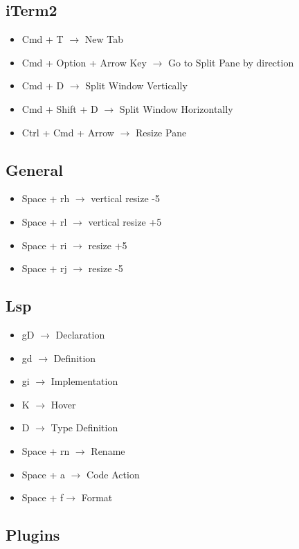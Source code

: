 \documentclass[12pt, a4paper]{article}
\begin{document}
\subsection{iTerm2}

\begin{itemize}
    \item Cmd + T $\rightarrow$ New Tab
    \item Cmd + Option + Arrow Key $\rightarrow$ Go to Split Pane by direction
    \item Cmd + D $\rightarrow$ Split Window Vertically 
    \item Cmd + Shift + D $\rightarrow$ Split Window Horizontally 
    \item Ctrl + Cmd + Arrow $\rightarrow$ Resize Pane
\end{itemize}

\subsection{General}
\begin{itemize}
    \item Space + rh $\rightarrow$ vertical resize -5
    \item Space + rl $\rightarrow$ vertical resize +5
    \item Space + ri $\rightarrow$ resize +5
    \item Space + rj $\rightarrow$ resize -5
\end{itemize}

\subsection{Lsp}

\begin{itemize}
    \item gD $\rightarrow$ Declaration
    \item gd $\rightarrow$ Definition 
    \item gi $\rightarrow$ Implementation 
    \item K $\rightarrow$ Hover
    \item D $\rightarrow$ Type Definition
    \item Space + rn $\rightarrow$ Rename
    \item Space + a $\rightarrow$ Code Action
    \item Space + f$\rightarrow$ Format 
\end{itemize}

\subsection{Plugins}
\end{document}
